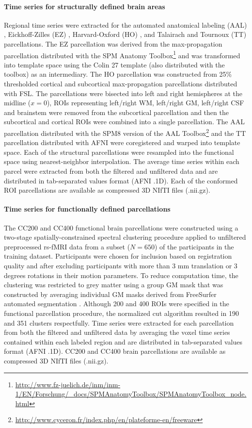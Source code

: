 \documentclass[preprint,12pt,3p]{elsarticle}
\begin{document}
\paragraph{Time series for structurally defined brain areas} Regional time series were extracted for the automated anatomical labeling (AAL) \cite{tzourio2002automated}, Eickhoff-Zilles (EZ) \cite{eickhoff2005new}, Harvard-Oxford (HO) \cite{HO_atlas_1, HO_atlas_2, HO_atlas_3, HO_atlas_4}, and Talairach and Tournoux (TT) \cite{lancaster2000automated} parcellations. The EZ parcellation was derived from the max-propagation parcellation distributed with the SPM Anatomy Toolbox\footnote{\url{http://www.fz-juelich.de/inm/inm-1/EN/Forschung/_docs/SPMAnatomyToolbox/SPMAnatomyToolbox_node.html}} and was transformed into template space using the Colin 27 template (also distributed with the toolbox) as an intermediary. The HO parcellation was constructed from 25\% thresholded cortical and subcortical max-propagation parcellations distributed with FSL. The parcellations were bisected into left and right hemispheres at the midline ($x=0$), ROIs representing left/right WM, left/right GM, left/right CSF and brainstem were removed from the subcortical parcellation and then the subcortical and cortical ROIs were combined into a single parcellation. The AAL parcellation distributed with the SPM8 version of the AAL Toolbox\footnote{\url{http://www.cyceron.fr/index.php/en/plateforme-en/freeware}} and the TT parcellation distributed with AFNI were coregistered and warped into template space. Each of the structural parcellations were resampled into the functional space using nearest-neighbor interpolation. The average time series within each parcel were extracted from both the filtered and unfiltered data and are distributed in tab-separated values format (AFNI .1D). Each of the conformed ROI parcellations are available as compressed 3D NIfTI files (.nii.gz).

\paragraph{Time series for functionally defined parcellations} The CC200 and CC400 functional brain parcellations were constructed using a two-stage spatially-constrained spectral clustering procedure \cite{craddock2012whole} applied to unfiltered preprocessed rs-fMRI data from a subset ($N=650$) of the participants in the training dataset. Participants were chosen for inclusion based on registration quality and after excluding participants with more than 3 mm translation or 3 degrees rotations in their motion parameters. To reduce computation time, the clustering was restricted to grey matter using a group GM mask that was constructed by averaging individual GM masks derived from FreeSurfer automated segmentation \cite{dale1999freesurfer}. Although 200 and 400 ROIs were specified in the functional parcellation procedure, the normalized cut algorithm resulted in 190 and 351 clusters respectfully. Time series were extracted for each parcellation from both the filtered and unfiltered data by averaging the voxel time series contained within each labeled region and are distributed in tab-separated values format (AFNI .1D). CC200 and CC400 brain parcellations are available as compressed 3D NIfTI files (.nii.gz).
\end{document}
